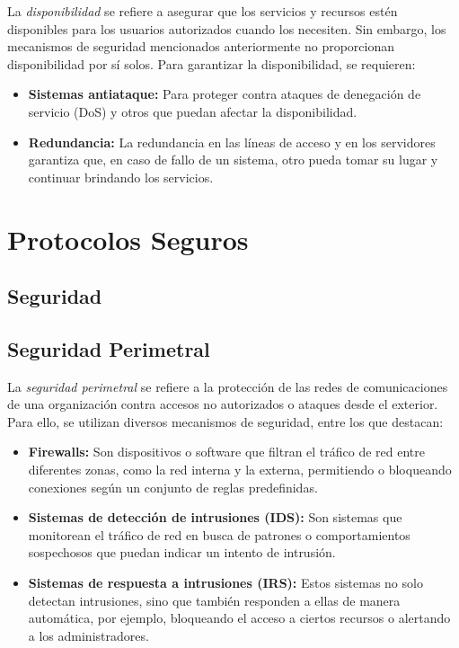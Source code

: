\documentclass[a4paper,12pt]{article}
\begin{document}
La \textit{disponibilidad} se refiere a asegurar que los servicios y recursos estén disponibles para los usuarios autorizados cuando los necesiten. Sin embargo, los mecanismos de seguridad mencionados anteriormente no proporcionan disponibilidad por sí solos. Para garantizar la disponibilidad, se requieren:

\begin{itemize}
    \item \textbf{Sistemas antiataque:} Para proteger contra ataques de denegación de servicio (DoS) y otros que puedan afectar la disponibilidad.
    \item \textbf{Redundancia:} La redundancia en las líneas de acceso y en los servidores garantiza que, en caso de fallo de un sistema, otro pueda tomar su lugar y continuar brindando los servicios.
\end{itemize}

\section{Protocolos Seguros}

\subsection{Seguridad}

\subsection*{Seguridad Perimetral}

La \textit{seguridad perimetral} se refiere a la protección de las redes de comunicaciones de una organización contra accesos no autorizados o ataques desde el exterior. Para ello, se utilizan diversos mecanismos de seguridad, entre los que destacan:

\begin{itemize}
    \item \textbf{Firewalls:} Son dispositivos o software que filtran el tráfico de red entre diferentes zonas, como la red interna y la externa, permitiendo o bloqueando conexiones según un conjunto de reglas predefinidas.
    \item \textbf{Sistemas de detección de intrusiones (IDS):} Son sistemas que monitorean el tráfico de red en busca de patrones o comportamientos sospechosos que puedan indicar un intento de intrusión.
    \item \textbf{Sistemas de respuesta a intrusiones (IRS):} Estos sistemas no solo detectan intrusiones, sino que también responden a ellas de manera automática, por ejemplo, bloqueando el acceso a ciertos recursos o alertando a los administradores.
\end{itemize}
\end{document}
